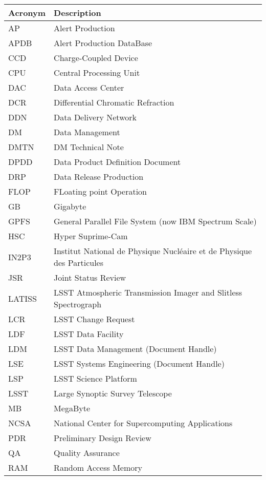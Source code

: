 \addtocounter{table}{-1}
\begin{longtable}{p{}p{}}\hline
\textbf{Acronym} & \textbf{Description}  \\\hline

AP & Alert Production \\\hline
APDB & Alert Production DataBase \\\hline
CCD & Charge-Coupled Device \\\hline
CPU & Central Processing Unit \\\hline
DAC & Data Access Center \\\hline
DCR & Differential Chromatic Refraction \\\hline
DDN & Data Delivery Network \\\hline
DM & Data Management \\\hline
DMTN & DM Technical Note \\\hline
DPDD & Data Product Definition Document \\\hline
DRP & Data Release Production \\\hline
FLOP & FLoating point Operation \\\hline
GB & Gigabyte \\\hline
GPFS & General Parallel File System (now IBM Spectrum Scale) \\\hline
HSC & Hyper Suprime-Cam \\\hline
IN2P3 & Institut National de Physique Nucléaire et de Physique des Particules \\\hline
JSR & Joint Status Review \\\hline
LATISS & LSST Atmospheric Transmission Imager and Slitless Spectrograph \\\hline
LCR & LSST Change Request \\\hline
LDF & LSST Data Facility \\\hline
LDM & LSST Data Management (Document Handle) \\\hline
LSE & LSST Systems Engineering (Document Handle) \\\hline
LSP & LSST Science Platform \\\hline
LSST & Large Synoptic Survey Telescope \\\hline
MB & MegaByte \\\hline
NCSA & National Center for Supercomputing Applications \\\hline
PDR & Preliminary Design Review \\\hline
QA & Quality Assurance \\\hline
RAM & Random Access Memory \\\hline

\end{longtable}
